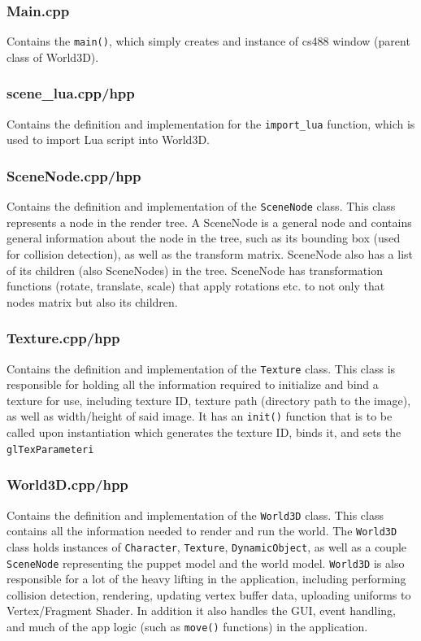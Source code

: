 \documentclass {article}
\begin{document}
\subsubsection{Main.cpp}
Contains the \texttt{main()}, which simply creates and instance of cs488 window (parent class of World3D).

\subsubsection{scene{\_}lua.cpp/hpp}
Contains the definition and implementation for the \texttt{import{\_}lua} function, which is used to import Lua script into World3D.

\subsubsection{SceneNode.cpp/hpp}
Contains the definition and implementation of the \texttt{SceneNode} class. This class represents a node in the render tree. A SceneNode is a general node and contains general information about the node in the tree, such as its bounding box (used for collision detection), as well as the transform matrix. SceneNode also has a list of its children (also SceneNodes) in the tree. SceneNode has transformation functions (rotate, translate, scale) that apply rotations etc. to not only that nodes matrix but also its children.

\subsubsection{Texture.cpp/hpp}
Contains the definition and implementation of the \texttt{Texture} class. This class is responsible for holding all the information required to initialize and bind a texture for use, including texture ID, texture path (directory path to the image), as well as width/height of said image. It has an \texttt{init()} function that is to be called upon instantiation which generates the texture ID, binds it, and sets the \texttt{glTexParameteri}

\subsubsection{World3D.cpp/hpp}
Contains the definition and implementation of the \texttt{World3D} class. This class contains all the information needed to render and run the world. The \texttt{World3D} class holds instances of \texttt{Character}, \texttt{Texture}, \texttt{DynamicObject}, as well as a couple \texttt{SceneNode} representing the puppet model and the world model. \texttt{World3D} is also responsible for a lot of the heavy lifting in the application, including performing collision detection, rendering, updating vertex buffer data, uploading uniforms to Vertex/Fragment Shader. In addition it also handles the GUI, event handling, and much of the app logic (such as \texttt{move()} functions) in the application.
\end{document}
